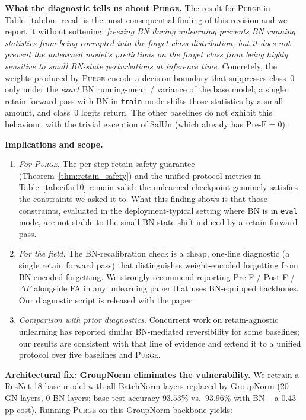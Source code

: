 \documentclass{article}
\newcommand{\ours}{\textsc{Purge}}
\begin{document}
{\textbf{What the diagnostic tells us about \ours{}.} The result for \ours{} in Table~\ref{tab:bn_recal} is the most consequential finding of this revision and we report it without softening: \emph{freezing BN during unlearning prevents BN running statistics from being corrupted into the forget-class distribution, but it does not prevent the unlearned model's predictions on the forget class from being highly sensitive to small BN-state perturbations at inference time}. Concretely, the weights produced by \ours{} encode a decision boundary that suppresses class~0 only under the \emph{exact} BN running-mean / variance of the base model; a single retain forward pass with BN in \texttt{train} mode shifts those statistics by a small amount, and class~0 logits return. The other baselines do not exhibit this behaviour, with the trivial exception of SalUn (which already has $\mathrm{Pre\text{-}F} = 0$).

\textbf{Implications and scope.}
\begin{enumerate}[nosep,leftmargin=*]
\item \emph{For \ours{}.} The per-step retain-safety guarantee (Theorem~\ref{thm:retain_safety}) and the unified-protocol metrics in Table~\ref{tab:cifar10} remain valid: the unlearned checkpoint genuinely satisfies the constraints we asked it to. What this finding shows is that those constraints, evaluated in the deployment-typical setting where BN is in \texttt{eval} mode, are not stable to the small BN-state shift induced by a retain forward pass.
\item \emph{For the field.} The BN-recalibration check is a cheap, one-line diagnostic (a single retain forward pass) that distinguishes weight-encoded forgetting from BN-encoded forgetting. We strongly recommend reporting Pre-F / Post-F / $\Delta F$ alongside FA in any unlearning paper that uses BN-equipped backbones. Our diagnostic script is released with the paper.
\item \emph{Comparison with prior diagnostics.} Concurrent work on retain-agnostic unlearning has reported similar BN-mediated reversibility for some baselines; our results are consistent with that line of evidence and extend it to a unified protocol over five baselines and \ours{}.
\end{enumerate}

\textbf{Architectural fix: GroupNorm eliminates the vulnerability.} We retrain a ResNet-18 base model with all BatchNorm layers replaced by GroupNorm (20 GN layers, 0 BN layers; base test accuracy $93.53$\% vs.\ $93.96$\% with BN -- a $0.43$pp cost). Running \ours{} on this GroupNorm backbone yields:

}
\end{document}
